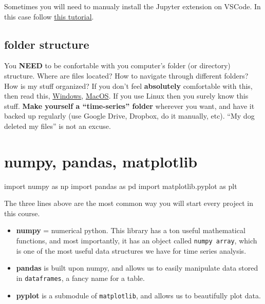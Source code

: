 \documentclass[
  letterpaper,
  DIV=11,
  numbers=noendperiod,
  oneside]{scrreprt}
\newenvironment{Shaded}{\begin{snugshade}}{\end{snugshade}}
\newcommand{\ImportTok}[1]{\textcolor[rgb]{0.00,0.46,0.62}{#1}}
\newcommand{\NormalTok}[1]{\textcolor[rgb]{0.00,0.23,0.31}{#1}}
\providecommand{\tightlist}{%
  \setlength{\itemsep}{0pt}\setlength{\parskip}{0pt}}\usepackage{longtable,booktabs,array}
\begin{document}
Sometimes you will need to manualy install the Jupyter extension on
VSCode. In this case follow
\href{https://code.visualstudio.com/docs/datascience/jupyter-notebooks}{this
tutorial}.

\hypertarget{folder-structure}{%
\section{folder structure}\label{folder-structure}}

You \textbf{NEED} to be confortable with you computer's folder (or
directory) structure. Where are files located? How to navigate through
different folders? How is my stuff organized? If you don't feel
\textbf{absolutely} comfortable with this, then read this,
\href{http://www2.westsussex.gov.uk/LearningandDevelopment/IT\%20Learning\%20Guides/Microsoft\%20Windows\%207/05\%20Working\%20with\%20folders.pdf}{Windows},
\href{https://recoverit.wondershare.com/mac-tips/mac-finder-tutorial-mac.html}{MacOS}.
If you use Linux then you surely know this stuff. \textbf{Make yourself
a ``time-series'' folder} wherever you want, and have it backed up
regularly (use Google Drive, Dropbox, do it manually, etc). ``My dog
deleted my files'' is not an excuse.

\hypertarget{numpy-pandas-matplotlib}{%
\chapter{numpy, pandas, matplotlib}\label{numpy-pandas-matplotlib}}

\begin{Shaded}
\begin{Highlighting}[]
\ImportTok{import}\NormalTok{ numpy }\ImportTok{as}\NormalTok{ np}
\ImportTok{import}\NormalTok{ pandas }\ImportTok{as}\NormalTok{ pd}
\ImportTok{import}\NormalTok{ matplotlib.pyplot }\ImportTok{as}\NormalTok{ plt}
\end{Highlighting}
\end{Shaded}

The three lines above are the most common way you will start every
project in this course.

\begin{itemize}
\tightlist
\item
  \textbf{numpy} = numerical python. This library has a ton useful
  mathematical functions, and most importantly, it has an object called
  \texttt{numpy\ array}, which is one of the most useful data structures
  we have for time series analysis.
\item
  \textbf{pandas} is built upon numpy, and allows us to easily
  manipulate data stored in \texttt{dataframes}, a fancy name for a
  table.
\item
  \textbf{pyplot} is a submodule of \texttt{matplotlib}, and allows us
  to beautifully plot data.
\end{itemize}
\end{document}

